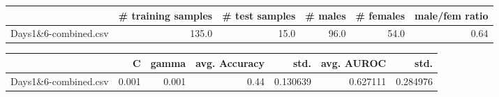 \begin{tabular}{lrrrrr}
\hline
{} &  \# training samples &  \# test samples &  \# males &  \# females &  male/fem ratio \\
\hline
Days1\&6-combined.csv &               135.0 &            15.0 &     96.0 &       54.0 &            0.64 \\
\hline
\end{tabular}
\begin{tabular}{lrrrrrr}
\hline
{} &      C &  gamma &  avg. Accuracy &      std. &  avg. AUROC &      std. \\
\hline
Days1\&6-combined.csv &  0.001 &  0.001 &           0.44 &  0.130639 &    0.627111 &  0.284976 \\
\hline
\end{tabular}
